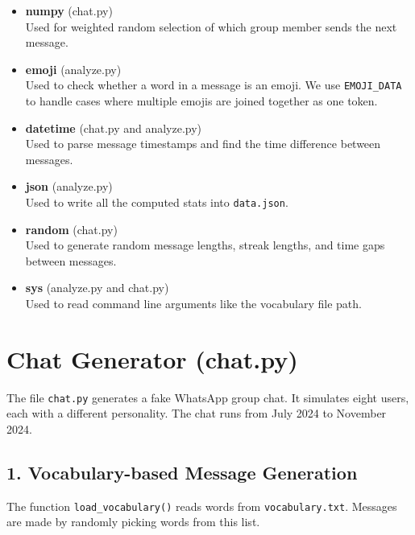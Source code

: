 \documentclass{article}
\begin{document}
\begin{itemize}
    \item \textbf{numpy} (chat.py) \\
    Used for weighted random selection of which group member sends the next message.

    \item \textbf{emoji} (analyze.py) \\
    Used to check whether a word in a message is an emoji. We use \texttt{EMOJI\_DATA} to handle cases where multiple emojis are joined together as one token.

    \item \textbf{datetime} (chat.py and analyze.py) \\
    Used to parse message timestamps and find the time difference between messages.

    \item \textbf{json} (analyze.py) \\
    Used to write all the computed stats into \texttt{data.json}.

    \item \textbf{random} (chat.py) \\
    Used to generate random message lengths, streak lengths, and time gaps between messages.

    \item \textbf{sys} (analyze.py and chat.py) \\
    Used to read command line arguments like the vocabulary file path.
\end{itemize}

\section{Chat Generator (chat.py)}

The file \texttt{chat.py} generates a fake WhatsApp group chat. It simulates eight users, each with a different personality. The chat runs from July 2024 to November 2024.

\subsection*{1. Vocabulary-based Message Generation}

The function \texttt{load\_vocabulary()} reads words from \texttt{vocabulary.txt}. Messages are made by randomly picking words from this list.
\end{document}
